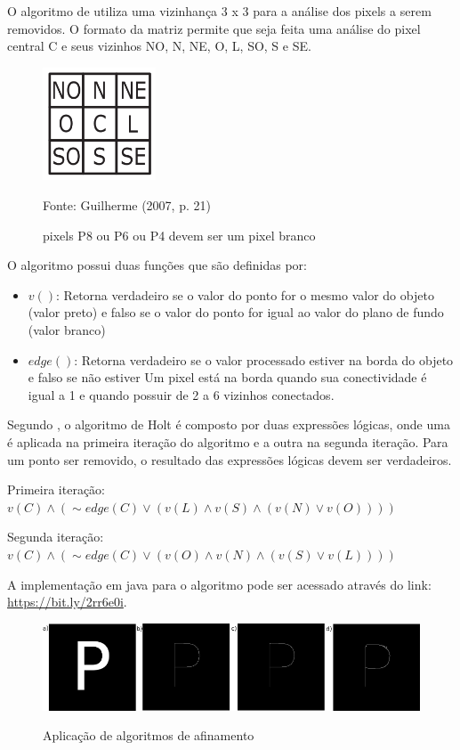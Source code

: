 \documentclass[
	12pt,				%
	oneside,			%
	a4paper,			%
	english,			%
	french,				%
	spanish,			%
	brazil,				%
	]{abntex2}
\begin{document}
O algoritmo de \citet{holt1987improved} utiliza uma vizinhança 3 x 3 para a análise dos pixels a serem removidos. O formato da matriz permite que seja feita uma análise do pixel central C e seus vizinhos NO, N, NE, O, L, SO, S e SE.

\begin{figure}[ht]
\centering
\caption{pixels P8 ou P6 ou P4 devem ser um pixel branco}
\includegraphics[width=0.3\textwidth]{imagens/holt.png}

Fonte: Guilherme (2007, p. 21)
\label{fig:holt}
\end{figure}

O algoritmo possui duas funções que são definidas por:

\begin{itemize}
\item \(v()\): Retorna verdadeiro se o valor do ponto for o mesmo valor do objeto (valor preto) e falso se o valor do ponto for igual ao valor do plano de fundo (valor branco)
\item \(edge()\): Retorna verdadeiro se o valor processado estiver na borda do objeto e falso se não estiver
\subitem Um pixel está na borda quando sua conectividade é igual a 1 e quando possuir de 2 a 6 vizinhos conectados. 
\end{itemize}

Segundo \citet{guilherme:2007}, o algoritmo de Holt é composto por duas expressões lógicas, onde uma é aplicada na primeira iteração do algoritmo e a outra na segunda iteração. Para um ponto ser removido, o resultado das expressões lógicas devem ser verdadeiros.

Primeira iteração: 
\(v(C) \wedge (\sim edge(C) \vee (v(L) \wedge v(S) \wedge (v(N) \vee v(O))))\)

Segunda iteração:
\(v(C) \wedge (\sim edge(C) \vee (v(O) \wedge v(N) \wedge (v(S) \vee v(L))))\)

A implementação em java para o algoritmo pode ser acessado através do link: \url{https://bit.ly/2rr6e0i}. 

\begin{figure}[ht]
\centering
\caption{Aplicação de algoritmos de afinamento}
\includegraphics[width=1\textwidth]{imagens/esqueletizacao.png}
\sourceAuthor
\label{fig:esqueletizacao}
\end{figure}
\end{document}
